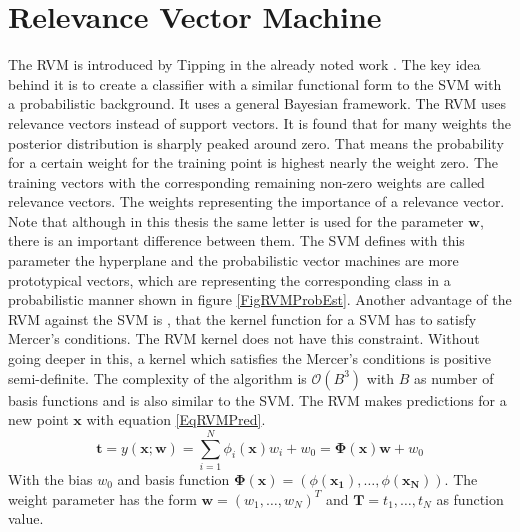 \section{Relevance Vector Machine}\label{PcSecRVM}
The \ac{RVM} is introduced by Tipping in the already noted work \cite{Tipping.2001}.
The key idea behind it is to create a classifier with a similar functional form to the \ac{SVM} with a probabilistic background. 
It uses a general Bayesian framework.\newline
The \acs{RVM} uses relevance vectors instead of support vectors.
It is found that for many weights the posterior distribution is sharply peaked around zero.
That means the probability for a certain weight for the training point is highest nearly the weight zero.
The training vectors with the corresponding remaining non-zero weights are called relevance vectors.
The weights representing the importance of a relevance vector.\cite[p. 213]{Tipping.2001}
Note that although in this thesis the same letter is used for the parameter $\mathbf{w}$, there is an important difference between them.
The \acs{SVM} defines with this parameter the hyperplane and the probabilistic vector machines are more prototypical vectors, which are representing the corresponding class in a probabilistic manner shown in figure \ref{FigRVMProbEst}.\cite[p. 222]{Tipping.2001}\newline
Another advantage of the \acs{RVM} against the \acs{SVM} is , that the kernel function for a \acs{SVM} has to satisfy Mercer's conditions.
The \ac{RVM} kernel does not have this constraint.\cite[p. 213]{Tipping.2001}\newline
Without going deeper in this, a kernel which satisfies the Mercer's conditions is positive semi-definite.\cite{Graepel.2002}
The complexity of the algorithm is $\mathcal{O}(B^3)$ with $B$ as number of basis functions and is also similar to the \ac{SVM}.\cite[p. 236-237]{Tipping.2001}\newline
The \ac{RVM} makes predictions for a new point $\mathbf{x}$ with equation \ref{EqRVMPred}.\cite[p. 211]{Tipping.2001}
\begin{equation}\label{EqRVMPred}
\mathbf{t} = y(\mathbf{x};\mathbf{w}) = \sum_{i=1}^{N}\phi_i(\mathbf{x})w_i + w_0 = \boldsymbol{\Phi}(\mathbf{x})\mathbf{w} + w_0
\end{equation}
With the bias $w_0$ and basis function $\boldsymbol{\Phi}(\mathbf{x}) = (\phi(\mathbf{x_1}),\dots,\phi(\mathbf{x_N}))$.
The weight parameter has the form $\mathbf{w} = (w_1,\dots,w_N)^T$ and $\mathbf{T}={t_1,\dots,t_N}$ as function value.\\
